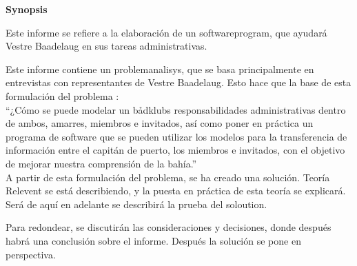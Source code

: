 \begin{center}\textbf{Synopsis}\\ \end{center}


Este informe se refiere a la elaboración de un softwareprogram, que ayudará Vestre Baadelaug en sus tareas administrativas. 

Este informe contiene un problemanalisys, que se basa principalmente en entrevistas con representantes de Vestre Baadelaug. Esto hace que la base de esta formulación del problema :\\

\enquote{¿Cómo se puede modelar un bådklubs responsabilidades administrativas dentro de ambos, amarres, miembros e invitados, así como poner en práctica un programa de software que se pueden utilizar los modelos para la transferencia de información entre el capitán de puerto, los miembros e invitados, con el objetivo de mejorar nuestra comprensión de la bahía.}\\

A partir de esta formulación del problema, se ha creado una solución. Teoría Relevent se está describiendo, y la puesta en práctica de esta teoría se explicará. Será de aquí en adelante se describirá la prueba del soloution. 

Para redondear, se discutirán las consideraciones y decisiones, donde después habrá una conclusión sobre el informe. Después la solución se pone en perspectiva.








